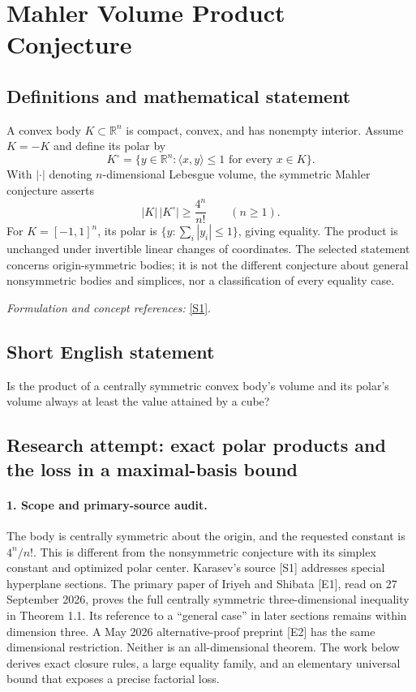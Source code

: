 \documentclass[11pt]{article}
\begin{document}
\section*{\texorpdfstring{Mahler Volume Product Conjecture}{Mahler Volume Product Conjecture}}\label{30001387}
\subsection{Definitions and mathematical statement}
A convex body $K\subset{\mathbb{R}}^n$ is compact, convex, and has nonempty interior. Assume $K=-K$ and define its polar by
\[
 K^\circ=\{y\in{\mathbb{R}}^n:\langle x,y\rangle\le1\text{ for every }x\in K\}.
\]
With $|\cdot|$ denoting $n$-dimensional Lebesgue volume, the symmetric Mahler conjecture asserts
\[
 |K|\,|K^\circ|\ge\frac{4^n}{n!}\qquad(n\ge1).
\]
For $K=[-1,1]^n$, its polar is $\{y:\sum_i|y_i|\le1\}$, giving equality. The product is unchanged under invertible linear changes of coordinates. The selected statement concerns origin-symmetric bodies; it is not the different conjecture about general nonsymmetric bodies and simplices, nor a classification of every equality case.
\par\smallskip\textit{Formulation and concept references:} \href{https://arxiv.org/pdf/1902.08971}{[S1]}.

\subsection{Short English statement}
Is the product of a centrally symmetric convex body's volume and its polar's volume always at least the value attained by a cube?
\subsection{Research attempt: exact polar products and the loss in a maximal-basis bound}
\paragraph{1. Scope and primary-source audit.}
The body is centrally symmetric about the origin, and the requested constant is $4^n/n!$. This is different from the nonsymmetric conjecture with its simplex constant and optimized polar center. Karasev's source [S1] addresses special hyperplane sections. The primary paper of Iriyeh and Shibata [E1], read on 27 September 2026, proves the full centrally symmetric three-dimensional inequality in Theorem 1.1. Its reference to a ``general case'' in later sections remains within dimension three. A May 2026 alternative-proof preprint [E2] has the same dimensional restriction. Neither is an all-dimensional theorem. The work below derives exact closure rules, a large equality family, and an elementary universal bound that exposes a precise factorial loss.
\end{document}
